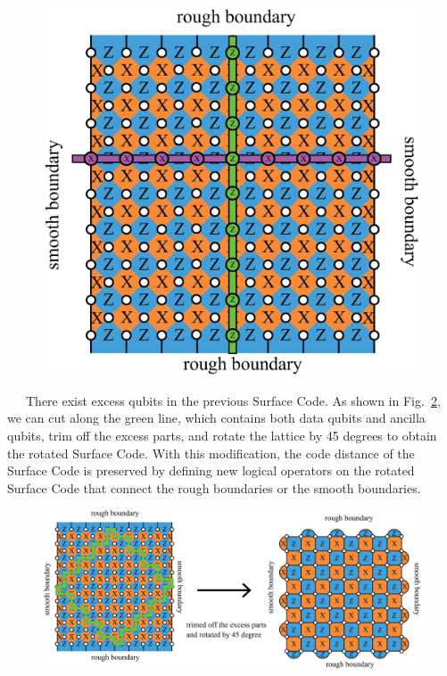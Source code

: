 \documentclass[a4paper,11pt]{ltjsarticle}
\begin{document}
{{        \begin{figure}[h]
            \centering
            \includegraphics[scale=0.30]{figure/logical_operator_planar.eps}
            \vspace{0pt}\caption{}
            \label{logical_operator_planar}
            \vspace{-10pt}
        \end{figure}

        \ \ \ There exist excess qubits in the previous Surface Code. As shown in Fig.~\ref{rotated_surface_code}, we can cut along the green line, which contains both data qubits and ancilla qubits, trim off the excess parts, and rotate the lattice by 45 degrees to obtain the rotated Surface Code. With this modification, the code distance of the Surface Code is preserved by defining new logical operators on the rotated Surface Code that connect the rough boundaries or the smooth boundaries.


        \begin{figure}[h]
            \centering
            \includegraphics[scale=0.25]{figure/rotated_surface_code.eps}
            \caption{}
            \label{rotated_surface_code}
            \vspace{-10pt}
        \end{figure}

        
    }
}
\end{document}
